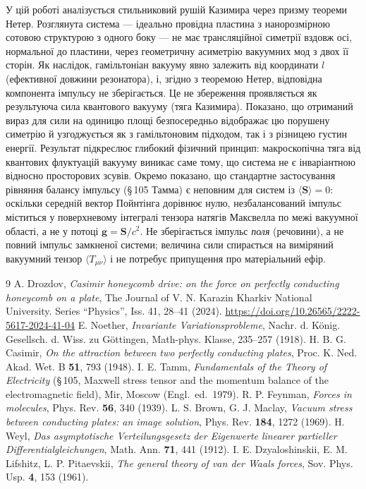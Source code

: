 \documentclass[twoside, 10pt]{article}
\begin{document}
У цій роботі аналізується стильниковий рушій Казимира через призму теореми Нетер.
Розглянута система — ідеально провідна пластина з нанорозмірною сотовою структурою
з одного боку — не має трансляційної симетрії вздовж осі, нормальної до пластини,
через геометричну асиметрію вакуумних мод з двох її сторін. Як наслідок,
гамільтоніан вакууму явно залежить від координати \(l\) (ефективної довжини резонатора),
і, згідно з теоремою Нетер, відповідна компонента імпульсу не зберігається.
Це не збереження проявляється як результуюча сила квантового вакууму (тяга Казимира).
Показано, що отриманий вираз для сили на одиницю площі безпосередньо відображає цю порушену
симетрію й узгоджується як з гамільтоновим підходом, так і з різницею густин енергії.
Результат підкреслює глибокий фізичний принцип: макроскопічна тяга від квантових флуктуацій
вакууму виникає саме тому, що система не є інваріантною відносно просторових зсувів.
Окремо показано, що стандартне застосування рівняння балансу імпульсу (\S\,105 Тамма)
є неповним для систем із $\langle\mathbf{S}\rangle=0$: оскільки середній вектор Пойнтінга
дорівнює нулю, незбалансований імпульс міститься у поверхневому інтегралі тензора натягів
Максвелла по межі вакуумної області, а не у потоці $\mathbf{g}=\mathbf{S}/c^2$. Не
зберігається імпульс \emph{поля} (речовини), а не повний імпульс замкненої системи;
величина сили спирається на виміряний вакуумний тензор $\langle T_{\mu\nu}\rangle$ і не
потребує припущення про матеріальний ефір.

\begin{thebibliography}{9}
A. Drozdov, \textit{Casimir honeycomb drive: on the force on perfectly conducting honeycomb on a plate}, The Journal of V. N. Karazin Kharkiv National University. Series “Physics”, Iss. 41, 28--41 (2024). \url{https://doi.org/10.26565/2222-5617-2024-41-04}
E. Noether, \textit{Invariante Variationsprobleme}, Nachr. d. König. Gesellsch. d. Wiss. zu Göttingen, Math-phys. Klasse, 235–257 (1918).
H. B. G. Casimir, \textit{On the attraction between two perfectly conducting plates}, Proc. K. Ned. Akad. Wet. B \textbf{51}, 793 (1948).
I. E. Tamm, \textit{Fundamentals of the Theory of Electricity} (\S\,105, Maxwell stress tensor and the momentum balance of the electromagnetic field), Mir, Moscow (Engl.\ ed.\ 1979).
R. P. Feynman, \textit{Forces in molecules}, Phys. Rev. \textbf{56}, 340 (1939).
L. S. Brown, G. J. Maclay, \textit{Vacuum stress between conducting plates: an image solution}, Phys. Rev. \textbf{184}, 1272 (1969).
H. Weyl, \textit{Das asymptotische Verteilungsgesetz der Eigenwerte linearer partieller Differentialgleichungen}, Math. Ann. \textbf{71}, 441 (1912).
I. E. Dzyaloshinskii, E. M. Lifshitz, L. P. Pitaevskii, \textit{The general theory of van der Waals forces}, Sov. Phys. Usp. \textbf{4}, 153 (1961).
\end{thebibliography}
\end{document}
